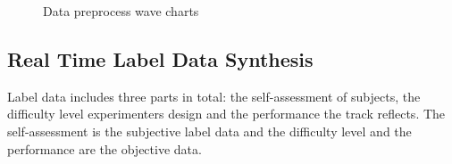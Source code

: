 \documentclass[runningheads,a4paper]{llncs}
\begin{document}
\begin{figure}
  \centering




  \caption{Data preprocess wave charts}
  \label{fig:wave} %
\end{figure}

\subsection{Real Time Label Data Synthesis}
Label data includes three parts in total: the self-assessment of subjects, the difficulty
level experimenters design and the performance the track reflects. The self-assessment
is the subjective label data and the difficulty level and the performance are the
objective data.
\end{document}
